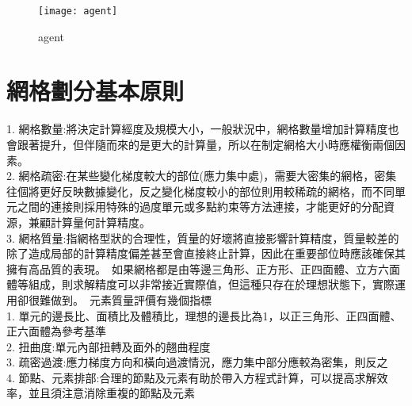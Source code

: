  
\iffalse
\begin{figure}[hbt!]
\begin{center}
\texttt{[image:  Reinforcement\_Learning\_interactions]}
\caption{\Large Reinforcement Learning interactions}
\end{center}
\end{figure}
\fi


\begin{figure}[hbt!]
\begin{center}
\texttt{[image: agent]}
\caption{\Large agent}
\label{agent}
\end{center}
\end{figure}
\begin{flushleft}
\end{flushleft}

\section{網格劃分基本原則}
1. 網格數量:將決定計算經度及規模大小，一般狀況中，網格數量增加計算精度也會跟著提升，但伴隨而來的是更大的計算量，所以在制定網格大小時應權衡兩個因素。\\

2. 網格疏密:在某些變化梯度較大的部位(應力集中處)，需要大密集的網格，密集往個將更好反映數據變化，反之變化梯度較小的部位則用較稀疏的網格，而不同單元之間的連接則採用特殊的過度單元或多點約束等方法連接，才能更好的分配資源，兼顧計算量何計算精度。\\

3. 網格質量:指網格型狀的合理性，質量的好壞將直接影響計算精度，質量較差的除了造成局部的計算精度偏差甚至會直接終止計算，因此在重要部位時應該確保其擁有高品質的表現。\
如果網格都是由等邊三角形、正方形、正四面體、立方六面體等組成，則求解精度可以非常接近實際值，但這種只存在於理想狀態下，實際運用卻很難做到。\
元素質量評價有幾個指標\\
1. 單元的邊長比、面積比及體積比，理想的邊長比為1，以正三角形、正四面體、正六面體為參考基準\\
2. 扭曲度:單元內部扭轉及面外的翹曲程度\\
3. 疏密過渡:應力梯度方向和橫向過渡情況，應力集中部分應較為密集，則反之\\
4. 節點、元素排部:合理的節點及元素有助於帶入方程式計算，可以提高求解效率，並且須注意消除重複的節點及元素\\


